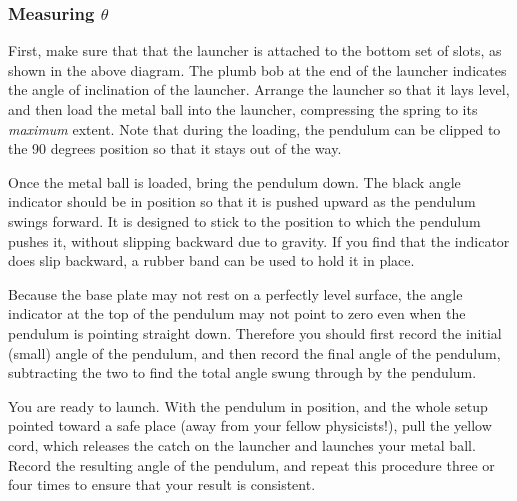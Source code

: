 \subsubsection{Measuring $\theta$}

First, make sure that that the launcher is attached to the bottom set of slots, as shown in the above diagram. The plumb bob at the end of the launcher indicates the angle of inclination of the launcher.  Arrange the launcher so that it lays level, and then load the metal ball into the launcher, compressing the spring to its \emph{maximum} extent.  Note that during the loading, the pendulum can be clipped to the 90 degrees position so that it stays out of the way. \myskip

Once the metal ball is loaded, bring the pendulum down.  The black angle indicator should be in position so that it is pushed upward as the pendulum swings forward.  It is designed to stick to the position to which the pendulum pushes it, without slipping backward due to gravity.  If you find that the indicator does slip backward, a rubber band can be used to hold it in place. \myskip

Because the base plate may not rest on a perfectly level surface, the angle indicator at the top of the pendulum may not point to zero even when the pendulum is pointing straight down.  Therefore you should first record the initial (small) angle of the pendulum, and then record the final angle of the pendulum, subtracting the two to find the total angle swung through by the pendulum.\myskip

You are ready to launch.  With the pendulum in position, and the whole setup pointed toward a safe place (away from your fellow physicists!), pull the yellow cord, which releases the catch on the launcher and launches your metal ball.  Record the resulting angle of the pendulum, and repeat this procedure three or four times to ensure that your result is consistent.



